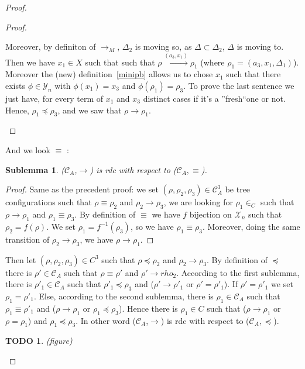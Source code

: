 \documentclass[a4paper,10pt]{report}
\newtheorem{slm}{Sublemma}[lm]
\newtheorem{td}{TODO}
\newcommand{\C}{\mathcal{C}_{A}}
\newcommand{\X}{\mathcal{X}_{n}}
\newcommand{\Y}{\mathcal{Y}_{n}}
\begin{document}
\begin{proof}
\begin{proof}
\begin{itemize}
     Moreover, by definiton of $\rightarrow_{M}$, $\Delta_2$ is moving so, as $\Delta \subset \Delta_2$, $\Delta$ is moving to.
     Then we have $x_1 \in X$ such that  such that $\rho \xrightarrow{(a_3,x_1)} \rho_1$ (where  $\rho_1 = (a_3,x_1,\Delta_1)$).
     Moreover the (new) definition~\ref{minipb} allows us to chose $x_1$ such that there exists $\phi \in \Y$ with $\phi(x_1) = x_3$ and $\phi(\rho_1) = \rho_3$. 
     To prove the last sentence we just have, for every term of $x_1$ and $x_3$ distinct cases if it's a ''fresh``one or not.
     Hence, $\rho_1 \preceq \rho_3$, and we saw that $\rho \rightarrow \rho_1$.
   \end{itemize}   
  \end{proof}
  And we look $\equiv$ :
  \begin{slm}
    ($\C$,$\rightarrow$) is rdc with respect to ($\C,\equiv$).
  \end{slm}
  \begin{proof}
    Same as the precedent proof: we set $(\rho, \rho_2  , \rho_3) \in \C^3 $ be tree configurations 
   such that $\rho \equiv \rho_2$ and $\rho_2 \rightarrow \rho_3$, we are looking for $\rho_1 \in _C$ such that $\rho \rightarrow \rho_1$  and $\rho_1 \equiv \rho_3$.
   By definition of $\equiv$ we have $f$ bijection on $\X$ such that $\rho_2 = f(\rho)$.  We set $\rho_1 = f^{-1}(\rho_3)$, so we have $\rho_1 \equiv \rho_3$.
   Moreover, doing the same transition of $\rho_2 \rightarrow \rho_3$, we have $\rho \rightarrow \rho_1$.    
  \end{proof}
  Then let $(\rho,\rho_2,\rho_3) \in C^3 $ such that $ \rho \preceq \rho_2 $ and $ \rho_2 \rightarrow \rho_3$.
  By definition of $\preceq$ there is $\rho' \in \C$ such that $\rho \equiv \rho'$ and $\rho' \rightarrow rho_2$.
  According to the first sublemma, there is $\rho'_1 \in \C$ such that $\rho'_1 \preceq \rho_3$ and ($\rho' \rightarrow \rho'_1$ or $\rho' = \rho'_1$).
  If $\rho' = \rho'_1$ we set $\rho_1 = \rho'_1$.
  Else, according to the second sublemma, there is $\rho_1 \in \C$ such that $\rho_1 \equiv \rho'_1$ and ($\rho \rightarrow \rho_1$ or $\rho_1 \preceq \rho_3$).
  Hence there is $\rho_1 \in C $ such that ($\rho \rightarrow \rho_1$ or $\rho = \rho_1$) and $\rho_1 \preceq \rho_3$.
  In other word ($\C$,$\rightarrow$) is rdc with respect to ($\C,\preceq$).

 
   \begin{td}
      (figure)
   \end{td}
\end{proof}
\end{document}
